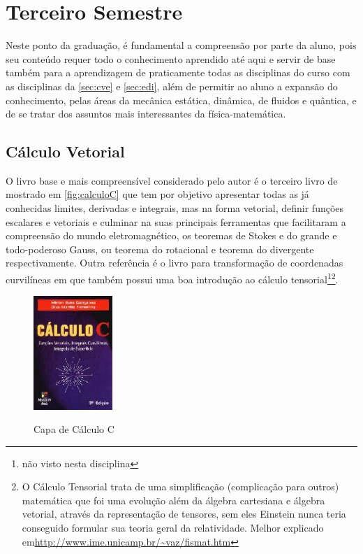 \documentclass[
	12pt,				%
	openright,			%
	oneside,			%
	a4paper,			%
	english,			%
	french,				%
	spanish,			%
	brazil				%
	]{abntex2}
\begin{document}
\chapter{Terceiro Semestre}\label{cap:3sem}
Neste ponto da graduação, é fundamental a compreensão por parte da aluno, pois seu conteúdo requer todo o conhecimento aprendido até aqui e servir de base também para a aprendizagem de praticamente todas as disciplinas do curso com as disciplinas da \autoref{sec:cve} e \autoref{sec:edi}, além de permitir ao aluno a expansão do conhecimento, pelas áreas da mecânica estática, dinâmica, de fluidos e quântica, e de se tratar dos assuntos mais interessantes da física-matemática.

\section{Cálculo Vetorial}\label{sec:cve}
O livro base e mais compreensível considerado pelo autor é o terceiro livro de  mostrado em \autoref{fig:calculoC} que tem por objetivo apresentar todas as já conhecidas limites, derivadas e integrais, mas na forma vetorial, definir funções escalares e vetoriais e culminar na suas principais ferramentas que facilitaram a compreensão do mundo eletromagnético, os teoremas de Stokes e do grande e todo-poderoso Gauss, ou teorema do rotacional e teorema do divergente respectivamente. Outra referência é o livro para transformação de coordenadas curvilíneas em  que também possui uma boa introdução ao cálculo tensorial\footnote{não visto nesta disciplina}\footnote{O Cálculo Tensorial trata de uma simplificação (complicação para outros) matemática que foi uma evolução além da álgebra cartesiana e álgebra vetorial, através da representação de tensores, sem eles Einstein nunca teria conseguido formular sua teoria geral da relatividade. Melhor explicado em\url{http://www.ime.unicamp.br/~vaz/fismat.htm}}.
\begin{figure}[!htb]
	\caption{Capa de Cálculo C}
	\centering
	\includegraphics[width=3cm]{calculoC.jpg}
	\label{fig:calculoC}
\end{figure}
\end{document}
